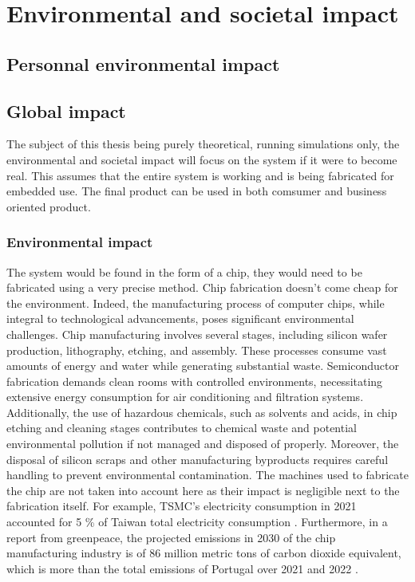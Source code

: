 \section{Environmental and societal impact}

\subsection{Personnal environmental impact}

\subsection{Global impact}

The subject of this thesis being purely theoretical, running simulations only, the environmental and societal impact will focus on the system if it were to become real. This assumes that the entire system is working and is being fabricated for embedded use. The final product can be used in both comsumer and business oriented product.

\subsubsection{Environmental impact}

The system would be found in the form of a chip, they would need to be fabricated using a very precise method. Chip fabrication doesn't come cheap for the environment. Indeed, the manufacturing process of computer chips, while integral to technological advancements, poses significant environmental challenges. Chip manufacturing involves several stages, including silicon wafer production, lithography, etching, and assembly. These processes consume vast amounts of energy and water while generating substantial waste. Semiconductor fabrication demands clean rooms with controlled environments, necessitating extensive energy consumption for air conditioning and filtration systems. Additionally, the use of hazardous chemicals, such as solvents and acids, in chip etching and cleaning stages contributes to chemical waste and potential environmental pollution if not managed and disposed of properly. Moreover, the disposal of silicon scraps and other manufacturing byproducts requires careful handling to prevent environmental contamination. The machines used to fabricate the chip are not taken into account here as their impact is negligible next to the fabrication itself. For example, TSMC's electricity consumption in 2021 accounted for 5 \% of Taiwan total electricity consumption \cite{chipEnv}. Furthermore, in a report from greenpeace, the projected emissions in 2030 of the chip manufacturing industry is of 86 million metric tons of carbon dioxide equivalent, which is more than the total emissions of Portugal over 2021 and 2022 \cite{greenReport,worldEmissions}.

